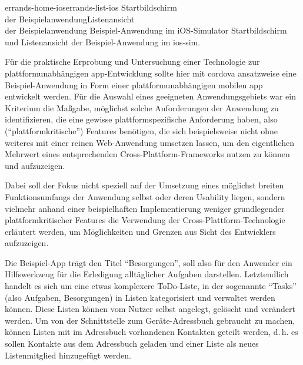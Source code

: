 

	{errands-home-ios}{errands-list-ios}
	{Startbildschirm \\ der Beispielanwendung}{Listenansicht \\der Beispielanwendung}
	{Beispiel-Anwendung im iOS-Simulator}
	{Startbildschirm und Listenansicht der Beispiel-Anwendung im \gls{ios-sim}.}
	{\ownScreenshot}

Für die praktische Erprobung und Untersuchung einer Technologie zur plattformunabhängigen \gls{app}-Entwicklung sollte hier mit \gls{cordova} ansatzweise eine Beispiel-Anwendung in Form einer plattformunabhängigen mobilen \gls{app} entwickelt werden.
Für die Auswahl eines geeigneten Anwendungsgebiets war ein Kriterium die Maßgabe, möglichst solche Anforderungen der Anwendung zu identifizieren, die eine gewisse plattformspezifische Anforderung haben, also (\enquote{plattformkritische}) Features benötigen, die sich beispielsweise nicht ohne weiteres mit einer reinen Web-Anwendung umsetzen lassen, um den eigentlichen Mehrwert eines entsprechenden Cross-Plattform-Frameworks nutzen zu können und aufzuzeigen.

Dabei soll der Fokus nicht speziell auf der Umsetzung eines möglichst breiten Funktionsumfangs der Anwendung selbst oder deren Usability liegen, sondern vielmehr anhand einer beispielhaften Implementierung weniger grundlegender plattformkritischer Features die Verwendung der Cross-Plattform-Technologie erläutert werden, um Möglichkeiten und Grenzen aus Sicht des Entwicklers aufzuzeigen.

Die Beispiel-App trägt den Titel \enquote{Besorgungen}, soll also für den Anwender ein Hilfswerkzeug für die Erledigung alltäglicher Aufgaben darstellen.
Letztendlich handelt es sich um eine etwas komplexere ToDo-Liste, in der sogenannte \enquote{Tasks} (also Aufgaben, Besorgungen) in Listen kategorisiert und verwaltet werden können.
Diese Listen können vom Nutzer selbst angelegt, gelöscht und verändert werden.
Um von der Schnittstelle zum Geräte-Adressbuch gebraucht zu machen, können Listen mit im Adressbuch vorhandenen Kontakten geteilt werden, d.\,h. es sollen Kontakte aus dem Adressbuch geladen und einer Liste als neues Listenmitglied hinzugefügt werden.

